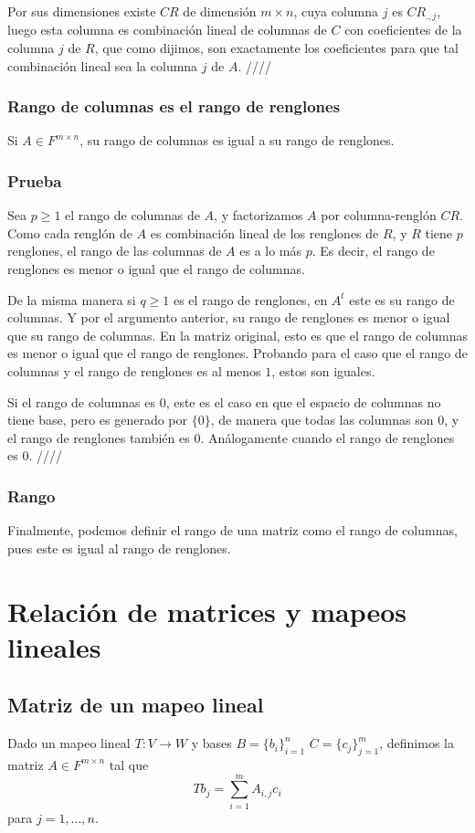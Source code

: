 \documentclass{article}
\begin{document}
Por sus dimensiones existe $CR$ de dimensión $m\times n$, cuya columna
$j$ es $CR_{.,j}$, luego esta columna es combinación lineal de columnas
de $C$ con coeficientes de la columna $j$ de $R$, que como dijimos, son
exactamente los coeficientes para que tal combinación lineal sea la columna $j$ de $A$. \hfill ////

\subsubsection{Rango de columnas es el rango de renglones}
Si $A\in F^{m\times n}$, su rango de columnas es igual a su rango
de renglones.
\subsubsection*{Prueba}
Sea $p\geq 1$ el rango de columnas de $A$, y factorizamos $A$
por columna-renglón $CR$. Como cada renglón de $A$ es
combinación lineal de los renglones de $R$, y $R$ tiene $p$
renglones, el rango de las columnas de $A$ es a lo más $p$.
Es decir, el rango de renglones es menor o igual que el rango de 
columnas.

De la misma manera si $q\geq 1$ es el rango de renglones, en $A^t$
este es su rango de columnas. Y por el argumento anterior, su
rango de renglones es menor o igual que su rango de columnas.
En la matriz original, esto es que el rango de columnas es menor
o igual que el rango de renglones. Probando para el caso que el rango 
de columnas y el rango de renglones es al menos $1$, estos son
iguales.

Si el rango de columnas es $0$, este es el caso en que el espacio de
columnas no tiene base, pero es generado por $\{0\}$, de manera que
todas las columnas son $0$, y el rango de renglones también es $0$. Análogamente cuando el rango de renglones es $0$.
\hfill ////

\subsubsection{Rango}
Finalmente, podemos definir el rango de una matriz como el rango de
columnas, pues este es igual al rango de renglones. 

\section{Relación de matrices y mapeos lineales}
\subsection{Matriz de un mapeo lineal}
Dado un mapeo lineal $T: V\rightarrow W$ y bases $B=\{b_i\}^n_{i=1}$
$C=\{c_j\}^m_{j=1}$, definimos la matriz $A\in F^{m\times n}$ tal que
$$Tb_j = \sum^m_{i=1} A_{i,j} c_i$$
para $j=1,\ldots,n$.
\end{document}
